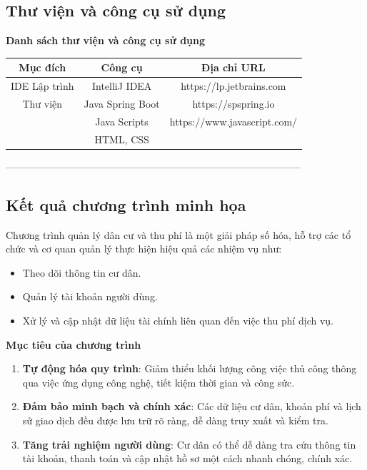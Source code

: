 \documentclass{article}
\begin{document}
\subsection{Thư viện và công cụ sử dụng}
\begin{center}
    \textbf{Danh sách thư viện và công cụ sử dụng} \\
    \begin{tabular}{|c|c|c|}
        \hline
        \textbf{Mục đích} & \textbf{Công cụ} & \textbf{Địa chỉ URL} \\
        \hline
        IDE Lập trình & IntelliJ IDEA & https://lp.jetbrains.com\\
        \hline
        Thư viện & Java Spring Boot & https://spspring.io\\
        \cline{2-3}
         & Java Scripts & https://www.javascript.com/\\
         \cline{2-3}
         & HTML, CSS & \\
        \hline
    \end{tabular}
\end{center}
-----------------------------------------------------------------------------------------
\subsection{Kết quả chương trình minh họa}
Chương trình quản lý dân cư và thu phí là một giải pháp số hóa, hỗ trợ các tổ chức và cơ quan quản lý thực hiện hiệu quả các nhiệm vụ như:

\begin{itemize}
    \item Theo dõi thông tin cư dân.
    \item Quản lý tài khoản người dùng.
    \item Xử lý và cập nhật dữ liệu tài chính liên quan đến việc thu phí dịch vụ.
\end{itemize}

\textbf{Mục tiêu của chương trình}
\begin{enumerate}
    \item \textbf{Tự động hóa quy trình}:
        Giảm thiểu khối lượng công việc thủ công thông qua việc ứng dụng công nghệ, tiết kiệm thời gian và công sức.
    \item \textbf{Đảm bảo minh bạch và chính xác}:
        Các dữ liệu cư dân, khoản phí và lịch sử giao dịch đều được lưu trữ rõ ràng, dễ dàng truy xuất và kiểm tra.
    \item \textbf{Tăng trải nghiệm người dùng}:
        Cư dân có thể dễ dàng tra cứu thông tin tài khoản, thanh toán và cập nhật hồ sơ một cách nhanh chóng, chính xác.
\end{enumerate}
\end{document}
